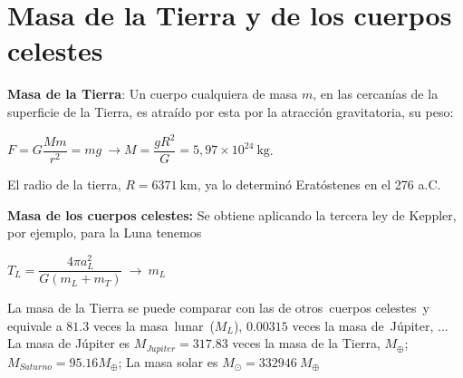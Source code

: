 \section{Masa de la Tierra y de los cuerpos celestes}

\textbf{Masa de la Tierra}: Un cuerpo cualquiera de masa $m$, en las cercanías de la superficie de la Tierra, es atraído por esta por la atracción gravitatoria, su peso:

$F=G\dfrac {Mm}{r^2}=mg \ \to M=\dfrac{g R^2}{G} = 5,97\times 10^{24}\ \mathrm{kg}$.

El radio de la tierra, $R=6371\ \mathrm{km}$, ya lo determinó Eratóstenes en el 276 a.C.


\textbf{Masa de los cuerpos celestes:} Se obtiene aplicando la tercera ley de Keppler, por ejemplo, para la Luna tenemos

$T_L=\dfrac {4 \pi a_L^2}{G(m_L+m_T)}\  \to \ m_L$

La masa de la Tierra se puede comparar con las de otros cuerpos celestes y equivale a $81.3$ veces la masa lunar ($M_L$), $0.00315$ veces la masa de Júpiter, ...
La masa de Júpiter es $M_{Jupiter}=317.83$ veces la masa de la Tierra, $M_\oplus$;  $M_{Saturno}=95.16 M_\oplus$; La masa solar es $M_\odot=332946\ M_\oplus$








